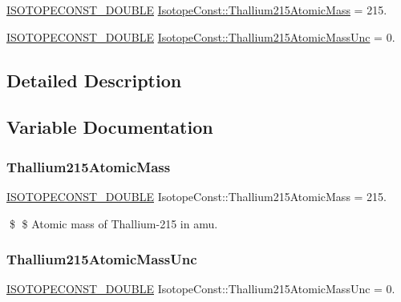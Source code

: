 \begin{DoxyCompactItemize}
\item 
\mbox{\hyperlink{group___isotope_const-_macros_ga8f45a7272ce02c0b4c65c44636ed719a}{I\+S\+O\+T\+O\+P\+E\+C\+O\+N\+S\+T\+\_\+\+D\+O\+U\+B\+LE}} \mbox{\hyperlink{group___isotope_const-_thallium-_tl215_gaec399c58ed472a5a179b06fb6ea4437d}{Isotope\+Const\+::\+Thallium215\+Atomic\+Mass}} = 215.
\item 
\mbox{\hyperlink{group___isotope_const-_macros_ga8f45a7272ce02c0b4c65c44636ed719a}{I\+S\+O\+T\+O\+P\+E\+C\+O\+N\+S\+T\+\_\+\+D\+O\+U\+B\+LE}} \mbox{\hyperlink{group___isotope_const-_thallium-_tl215_gae8000b1dcb311bb810ef0befa3f8ad11}{Isotope\+Const\+::\+Thallium215\+Atomic\+Mass\+Unc}} = 0.
\end{DoxyCompactItemize}


\subsection{Detailed Description}


\subsection{Variable Documentation}
\mbox{\label{group___isotope_const-_thallium-_tl215_gaec399c58ed472a5a179b06fb6ea4437d}} 
\subsubsection{\texorpdfstring{Thallium215\+Atomic\+Mass}{Thallium215AtomicMass}}
{\footnotesize\ttfamily \mbox{\hyperlink{group___isotope_const-_macros_ga8f45a7272ce02c0b4c65c44636ed719a}{I\+S\+O\+T\+O\+P\+E\+C\+O\+N\+S\+T\+\_\+\+D\+O\+U\+B\+LE}} Isotope\+Const\+::\+Thallium215\+Atomic\+Mass = 215.}

\$ \$ Atomic mass of Thallium-\/215 in amu. \mbox{\label{group___isotope_const-_thallium-_tl215_gae8000b1dcb311bb810ef0befa3f8ad11}} 
\subsubsection{\texorpdfstring{Thallium215\+Atomic\+Mass\+Unc}{Thallium215AtomicMassUnc}}
{\footnotesize\ttfamily \mbox{\hyperlink{group___isotope_const-_macros_ga8f45a7272ce02c0b4c65c44636ed719a}{I\+S\+O\+T\+O\+P\+E\+C\+O\+N\+S\+T\+\_\+\+D\+O\+U\+B\+LE}} Isotope\+Const\+::\+Thallium215\+Atomic\+Mass\+Unc = 0.}

